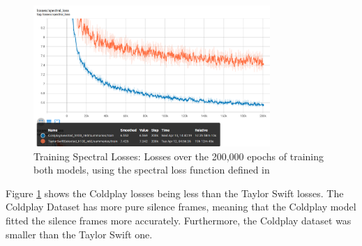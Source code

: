 \begin{figure}[H]
    \centering
    \includegraphics[width=0.8\textwidth]{research/training/TrainingSpectralLosses.png}
    \caption{Training Spectral Losses: Losses over the 200,000 epochs of training both models, using the spectral loss function defined in }
    \label{fig:training_spectral_losses}
\end{figure}

Figure \ref{fig:training_spectral_losses} shows the Coldplay losses being less than the Taylor Swift losses. The Coldplay Dataset has more pure silence frames, meaning that the Coldplay model fitted the silence frames more accurately. Furthermore, the Coldplay dataset was smaller than the Taylor Swift one.
